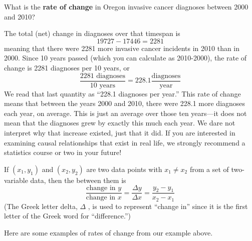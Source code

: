 \documentclass[nooutcomes]{ximera}
\begin{document}
\begin{example}
What is the \textbf{rate of change} in Oregon invasive cancer diagnoses between 2000 and 2010? 

\begin{explanation}
The total (net) change in diagnoses over that timespan is
$$19727-17446=2281$$
meaning that there were 2281 more invasive cancer incidents in 2010 than in 2000. Since 10 years passed (which you can calculate as 2010-2000), the rate of change is 2281 diagnoses per 10 years, or
$$\frac{2281 \text{ diagnoses}}{10 \text{ years}} = 228.1 \frac{\text{diagnoses}}{\text{year}}$$
We read that last quantity as “228.1 diagnoses per year.” This rate of change means that between the years 2000 and 2010, there were 228.1 more diagnoses each year, on average. This is just an average over those ten years—it does not mean that the diagnoses grew by exactly this much each year.  We dare not interpret why that increase existed,  just that it did.  If you are interested in examining causal relationships that exist in real life,  we strongly recommend a statistics course or two in your future!
\end{explanation}
\end{example}


\begin{definition} 
 If $(x_1,y_1)$ and $(x_2,y_2)$ are two data points with $x_1 \neq x_2$ from a set of two-variable data, then the  between them is
$$ \frac{\text{change in } y}{\text{change in } x} = \frac{\Delta y}{\Delta x} = \frac{y_2-y_1}{x_2-x_1}$$
(The Greek letter delta, $\Delta$ , is used to represent “change in” since it is the first letter of the Greek word for “difference.”)
\end{definition}


Here are some examples of rates of change from our example above.
\end{document}
